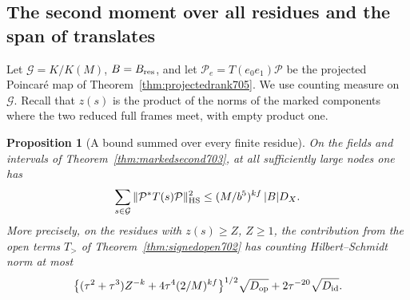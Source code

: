 \documentclass[a4paper,11pt]{article}
\newtheorem{proposition}{Proposition}[section]
\theoremstyle{definition}
\theoremstyle{remark}
\numberwithin{equation}{section}
\begin{document}
\subsection{The second moment over all residues and the span of translates}
\label{sec:translates706}

Let \(\mathcal G=K/K(M)\), \(B=B_{\rm res}\), and let
\(\mathcal P_e=T(e_0e_1)\mathcal P\) be the projected
Poincar\'e map of Theorem~\ref{thm:projectedrank705}. We use
counting measure on \(\mathcal G\). Recall that \(z(s)\) is
the product of the norms of the marked components where the
two reduced full frames meet, with empty product one.

\begin{proposition}[A bound summed over every finite residue]\leavevmode
\label{prop:allresidue706}
On the fields and intervals of Theorem~\ref{thm:markedsecond703},
at all sufficiently large nodes one has
\[
  \sum_{s\in\mathcal G}\|\mathcal P^*T(s)\mathcal P\|_{\rm HS}^2
                \le (M/b^5)^{kf}\,|B|D_X .
\]
More precisely, on the residues with \(z(s)\ge Z\), \(Z\ge1\),
the contribution from the open terms \(T_>\) of
Theorem~\ref{thm:signedopen702} has counting Hilbert--Schmidt
norm at most
\[
 \big\{(\tau^2+\tau^3)Z^{-k}+4\tau^4(2/M)^{kf}\big\}^{1/2}
          \sqrt{D_{\rm op}}+2\tau^{-20}\sqrt{D_{\rm id}} .
\]
\end{proposition}
\end{document}
